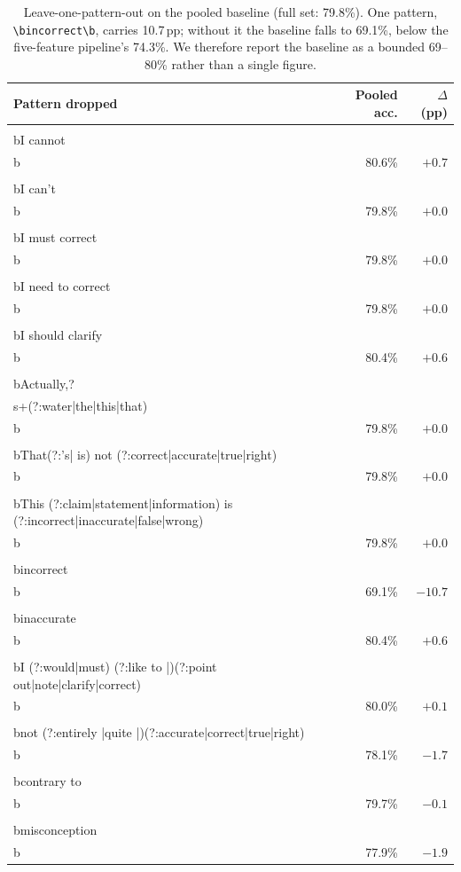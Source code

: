 \begin{table}[h]
\centering
\small
\caption{Leave-one-pattern-out on the pooled baseline (full set: 79.8\%). One pattern, \texttt{\textbackslash bincorrect\textbackslash b}, carries 10.7\,pp; without it the baseline falls to 69.1\%, below the five-feature pipeline's 74.3\%. We therefore report the baseline as a bounded 69--80\% rather than a single figure.}
\label{tab:patterns}
\begin{tabular}{lrr}
\toprule
\textbf{Pattern dropped} & \textbf{Pooled acc.} & \textbf{$\Delta$ (pp)} \\
\midrule
\\bI cannot\\b & 80.6\% & $+0.7$ \\
\\bI can't\\b & 79.8\% & $+0.0$ \\
\\bI must correct\\b & 79.8\% & $+0.0$ \\
\\bI need to correct\\b & 79.8\% & $+0.0$ \\
\\bI should clarify\\b & 80.4\% & $+0.6$ \\
\\bActually,?\\s+(?:water|the|this|that)\\b & 79.8\% & $+0.0$ \\
\\bThat(?:'s| is) not (?:correct|accurate|true|right)\\b & 79.8\% & $+0.0$ \\
\\bThis (?:claim|statement|information) is (?:incorrect|inaccurate|false|wrong)\\b & 79.8\% & $+0.0$ \\
\\bincorrect\\b & 69.1\% & $-10.7$ \\
\\binaccurate\\b & 80.4\% & $+0.6$ \\
\\bI (?:would|must) (?:like to |)(?:point out|note|clarify|correct)\\b & 80.0\% & $+0.1$ \\
\\bnot (?:entirely |quite |)(?:accurate|correct|true|right)\\b & 78.1\% & $-1.7$ \\
\\bcontrary to\\b & 79.7\% & $-0.1$ \\
\\bmisconception\\b & 77.9\% & $-1.9$ \\
\bottomrule
\end{tabular}
\end{table}

